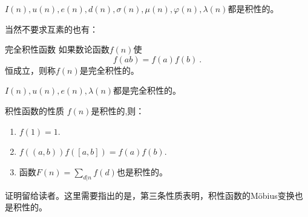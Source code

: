 \begin{example}{}
$I(n),u(n),e(n),d(n),\sigma(n),\mu(n),\varphi(n),\lambda(n)$都是积性的。
\end{example}

当然不要求互素的也有：

\begin{definition}{完全积性函数}
如果数论函数$f(n)$使
\begin{equation}
f(ab)=f(a)f(b)~.
\end{equation}
恒成立，则称$f(n)$是完全积性的。
\end{definition}

\begin{example}{}
$I(n),u(n),e(n),\lambda(n)$都是完全积性的。
\end{example}

\begin{theorem}{积性函数的性质}
$f(n)$是积性的,则：
\begin{enumerate}
\item $f(1)=1$.
\item $f((a,b))f([a,b])=f(a)f(b)$.
\item 函数$F(n)=\sum\limits_{d|n}f(d)$也是积性的。
\end{enumerate}
\end{theorem}

证明留给读者。这里需要指出的是，第三条性质表明，积性函数的Möbius变换也是积性的。
